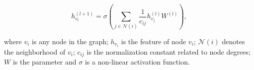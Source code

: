 $$
h_{v_i}^{(l+1)} = \sigma \left(\sum_{j\in\mathcal{N}(i)}\frac{1}{c_{ij}}h_{v_j}^{(l)}W^{(l)} \right),
$$

where $v_i$ is any node in the graph; $h_{v_i}$ is the feature of node $v_i$; $\mathcal{N}(i)$ denotes the neighborhood of $v_i$; $c_{ij}$ is the normalization constant related to node degrees; $W$ is the parameter and $\sigma$ is a non-linear activation function.




